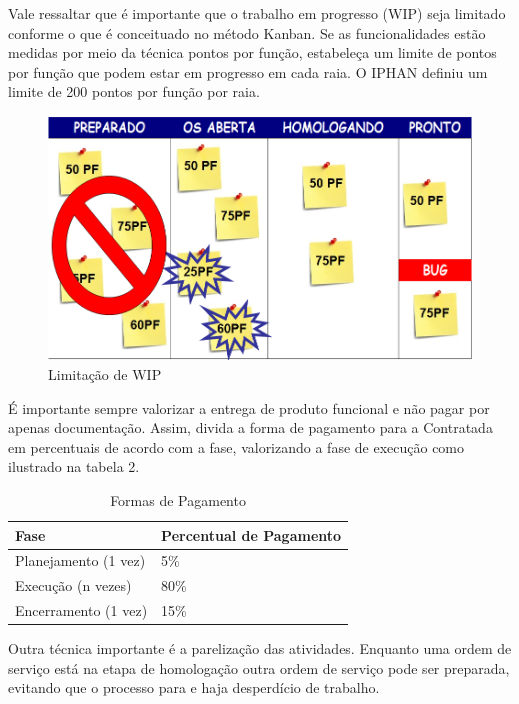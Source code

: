 Vale ressaltar que é importante que o trabalho em progresso (WIP) seja limitado conforme o que é conceituado no método Kanban. Se as funcionalidades estão medidas por meio da técnica pontos por função, estabeleça um limite de pontos por função que podem estar em progresso em cada raia. O IPHAN definiu um limite de 200 pontos por função por raia. 

\begin{figure}[h]
		\centering
		\label{fig08}
			\includegraphics[scale=0.5]{figuras/kanbanIPHAN4.png}
		\caption{Limitação de WIP \cite{parente}}
\end{figure}


É importante sempre valorizar a entrega de produto funcional e não pagar por apenas documentação. Assim, divida a forma de pagamento para a Contratada em percentuais de acordo com a fase, valorizando a fase de execução como ilustrado na tabela 2.


\begin{table}[H]
\center
\footnotesize
\begin{tabular}{|p{6cm}|p{6cm}|}
  \hline
   \textbf{Fase} & \textbf{Percentual de Pagamento}\\
    \hline
   Planejamento (1 vez) & 5\%\\
   \hline    
   Execução (n vezes) & 80\%\\
    \hline
   Encerramento (1 vez) & 15\%\\
   \hline
\end{tabular}
\caption{Formas de Pagamento}
\end{table}


Outra técnica importante é a parelização das atividades. Enquanto uma ordem de serviço está na etapa de homologação outra ordem de serviço pode ser preparada, evitando que o processo para e haja desperdício de trabalho. 

